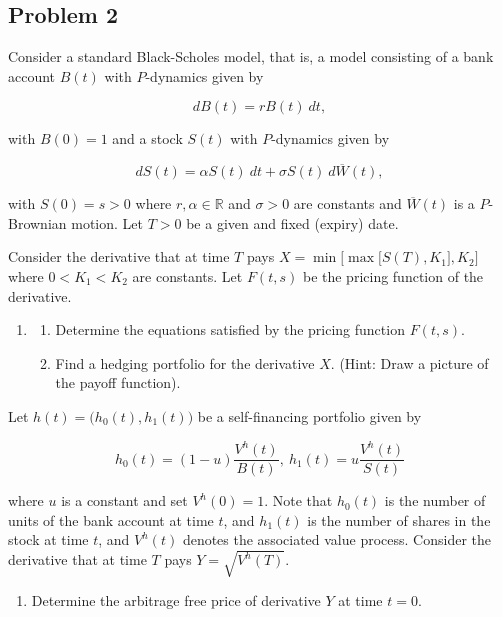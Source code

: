 \documentclass[
]{book}
\providecommand{\tightlist}{%
  \setlength{\itemsep}{0pt}\setlength{\parskip}{0pt}}
\begin{document}
\noindent\makebox[\linewidth]{\rule{\textwidth}{0.4pt}}

\hypertarget{problem-2-2}{%
\subsection{Problem 2}\label{problem-2-2}}

Consider a standard Black-Scholes model, that is, a model consisting of a bank account \(B(t)\) with \(P\)-dynamics given by

\[
dB(t)=rB(t)\ dt,
\]

with \(B(0)=1\) and a stock \(S(t)\) with \(P\)-dynamics given by

\[
dS(t)=\alpha S(t)\ dt+\sigma S(t)\ d\overline{W}(t),
\]

with \(S(0)=s>0\) where \(r,\alpha\in\mathbb{R}\) and \(\sigma >0\) are constants and \(\overline{W}(t)\) is a \(P\)-Brownian motion. Let \(T>0\) be a given and fixed (expiry) date.

Consider the derivative that at time \(T\) pays \(X=\min\Big[\max\Big[S(T),K_1\Big],K_2\Big]\) where \(0<K_1<K_2\) are constants. Let \(F(t,s)\) be the pricing function of the derivative.

\begin{enumerate}
\def\labelenumi{\alph{enumi}.}
\item
  \begin{enumerate}
  \def\labelenumii{\roman{enumii}.}
  \tightlist
  \item
    Determine the equations satisfied by the pricing function \(F(t,s)\).
  \item
    Find a hedging portfolio for the derivative \(X\). (Hint: Draw a picture of the payoff function).
  \end{enumerate}
\end{enumerate}

Let \(h(t)=\Big(h_0(t),h_1(t)\Big)\) be a self-financing portfolio given by

\[
h_0(t)=(1-u)\frac{V^h(t)}{B(t)},\ h_1(t)=u\frac{V^h(t)}{S(t)}
\]

where \(u\) is a constant and set \(V^h(0)=1\). Note that \(h_0(t)\) is the number of units of the bank account at time \(t\), and \(h_1(t)\) is the number of shares in the stock at time \(t\), and \(V^h(t)\) denotes the associated value process. Consider the derivative that at time \(T\) pays \(Y=\sqrt{V^h(T)}\).

\begin{enumerate}
\def\labelenumi{\alph{enumi}.}
\setcounter{enumi}{1}
\tightlist
\item
  Determine the arbitrage free price of derivative \(Y\) at time \(t=0\).
\end{enumerate}
\end{document}
